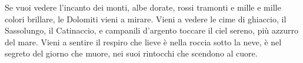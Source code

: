 \beginverse
Se vuoi vedere l'incanto dei monti,
albe dorate, rossi tramonti
e mille e mille colori brillare,
le Dolomiti vieni a mirare.
\endverse
\beginverse
Vieni a vedere le cime di ghiaccio,
il Sassolungo, il Catinaccio,
e campanili d'argento toccare
il ciel sereno, più azzurro del mare.
\endverse
\beginverse
Vieni a sentire il respiro che lieve
è nella roccia sotto la neve,
è nel segreto del giorno che muore,
nei suoi rintocchi che scendono al cuore.
\endverse
\endsong
